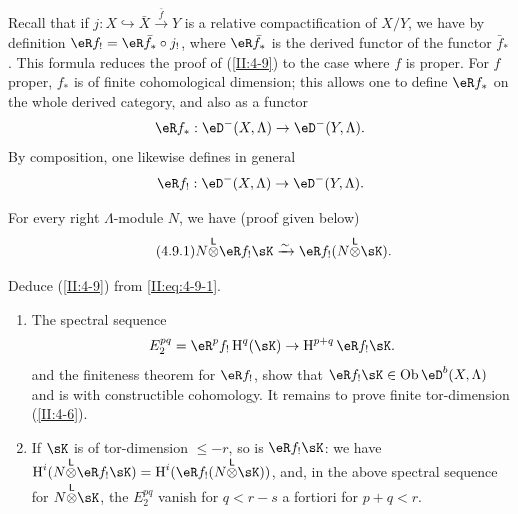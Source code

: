 Recall that if $j:X\hookrightarrow \bar X \xrightarrow{\bar f} Y$ is a
relative compactification of $X/Y$, we have by definition
$\eR f_! = \eR \bar f_* \circ j_!$, where $\eR \bar f_*$ is the derived functor
of the functor $\bar f_*$. This formula reduces the proof of (\ref{II:4-9})
to the case where $f$ is proper. For $f$ proper, $f_*$ is of finite
cohomological dimension; this allows one to define $\eR f_*$ on the whole
derived category, and also as a functor
\[
  \eR f_* : \eD^-(X,\Lambda) \to \eD^-(Y,\Lambda) \text{.}
\]
By composition, one likewise defines in general
\[
  \eR f_! : \eD^-(X,\Lambda) \to \eD^-(Y,\Lambda) \text{.}
\]

For every right $\Lambda$-module $N$, we have (proof given below)
\begin{equation*}\tag{4.9.1}\label{II:eq:4-9-1}
  N\lotimes \eR f_! \sK \iso \eR f_! (N\lotimes \sK) \text{.}
\end{equation*}

Deduce (\ref{II:4-9}) from \eqref{II:eq:4-9-1}.
\begin{enumerate}[\indent a)]
  \item The spectral sequence
    \[
      E_2^{p q} = \eR^p f_! \h^q(\sK) \rightarrow \h^{p+q} \eR f_! \sK \text{.}
    \]
    and the finiteness theorem for $\eR f_!$, show that
    $\eR f_!\sK\in \ob \eD^b(X,\Lambda)$ and is with constructible cohomology.
    It remains to prove finite tor-dimension (\ref{II:4-6}).
  \item If $\sK$ is of tor-dimension $\leqslant -r$, so is
    $\eR f_! \sK$: we have $\h^i(N\lotimes \eR f_! \sK) = \h^i(\eR f_!(N\lotimes \sK))$,
    and, in the above spectral sequence for $N\lotimes \sK$, the
    $E_2^{p q}$ vanish for $q<r-s$ a fortiori for $p+q<r$.
\end{enumerate}

